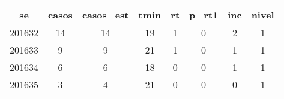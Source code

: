 \begin{tabular}{c|ccccccc}
  \hline
se & casos & casos\_est & tmin & rt & p\_rt1 & inc & nivel \\ 
  \hline
201632 & 14 & 14 & 19 & 1 & 0 & 2 & 1 \\ 
  201633 & 9 & 9 & 21 & 1 & 0 & 1 & 1 \\ 
  201634 & 6 & 6 & 18 & 0 & 0 & 1 & 1 \\ 
  201635 & 3 & 4 & 21 & 0 & 0 & 0 & 1 \\ 
   \hline
\end{tabular}
